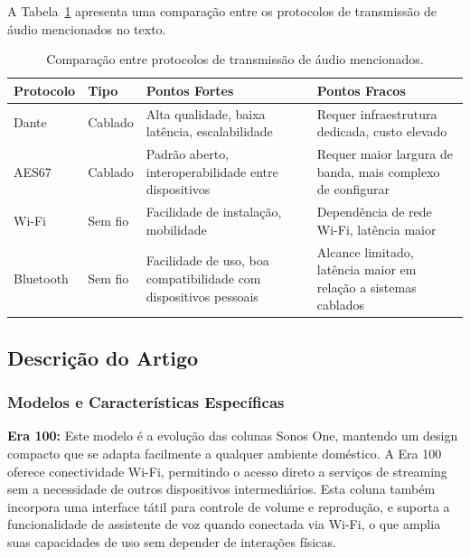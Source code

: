 \documentclass{article}
\begin{document}
\newpage

A Tabela~\ref{tab:comparacao_protocolos} apresenta uma comparação entre os protocolos de transmissão de áudio mencionados no texto.

\begin{table}[h]
    \centering
    \begin{tabular}{@{}l p{4cm} p{4cm} p{4cm}@{}}
        \toprule
        \textbf{Protocolo} & \textbf{Tipo} & \textbf{Pontos Fortes} & \textbf{Pontos Fracos} \\
        \midrule
        Dante & Cablado & Alta qualidade, baixa latência, escalabilidade & Requer infraestrutura dedicada, custo elevado \\
        AES67 & Cablado & Padrão aberto, interoperabilidade entre dispositivos & Requer maior largura de banda, mais complexo de configurar \\
        Wi-Fi & Sem fio & Facilidade de instalação, mobilidade & Dependência de rede Wi-Fi, latência maior \\
        Bluetooth & Sem fio & Facilidade de uso, boa compatibilidade com dispositivos pessoais & Alcance limitado, latência maior em relação a sistemas cablados \\
        \bottomrule
    \end{tabular}
    \caption{Comparação entre protocolos de transmissão de áudio mencionados.}
    \label{tab:comparacao_protocolos}
\end{table}



\clearpage
\newpage

\subsection{Descrição do Artigo}
\vspace{0.2cm}

\subsubsection{Modelos e Características Específicas}
\vspace{0.2cm}



\textbf{Era 100:} Este modelo é a evolução das colunas Sonos One, mantendo um design compacto que se adapta facilmente a qualquer ambiente doméstico. A Era 100 oferece conectividade Wi-Fi, permitindo o acesso direto a serviços de streaming sem a necessidade de outros dispositivos intermediários. Esta coluna também incorpora uma interface tátil para controle de volume e reprodução, e suporta a funcionalidade de assistente de voz quando conectada via Wi-Fi, o que amplia suas capacidades de uso sem depender de interações físicas.
\end{document}
